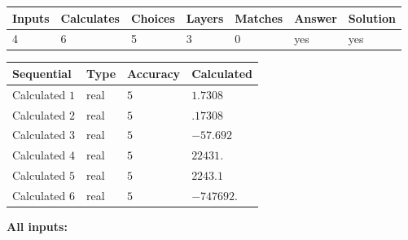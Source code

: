 \documentclass[12pt]{article}
\begin{document}
   
\noindent\begin{tabular}{|l|l|l|l|l|l|l|}
 \hline
Inputs & Calculates & Choices & Layers & Matches & Answer & Solution \\ \hline
           4 & 
           6 & 
           5
  & 
           3 & 
           0 & 
  yes & 
  yes 
  \\ \hline
 \end{tabular}
   
   
   
   
\noindent{}
   
   
  
  
\noindent\begin{tabular}{|l|l|l|l|}
\hline
 Sequential & Type & Accuracy & Calculated \\ 
\hline
 
 
  Calculated $           1$ & real & $           5 $ & 
 $ 1.7308 $ 
 \\  \hline  
 
 
  Calculated $           2$ & real & $           5 $ & 
 $ .17308 $ 
 \\  \hline  
 
 
  Calculated $           3$ & real & $           5 $ & 
 $ -57.692 $ 
 \\  \hline  
 
 
  Calculated $           4$ & real & $           5 $ & 
 $ 22431. $ 
 \\  \hline  
 
 
  Calculated $           5$ & real & $           5 $ & 
 $ 2243.1 $ 
 \\  \hline  
 
 
  Calculated $           6$ & real & $           5 $ & 
 $ -747692. $ 
 \\  \hline  
 \end{tabular}
   
   
   
   
\noindent\vspace{0.1in}\hspace{-0.08in} {\textbf{\Large{All inputs: }}}
   
   
  
\end{document}
